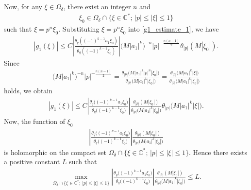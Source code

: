 \documentclass[11pt]{article}
\numberwithin{equation}{section}
\begin{document}
Now, for any $\xi \in\Omega_\delta$, there exist an integer $n$ and
\begin{gather*}
\xi_0\in\Omega_\delta \cap\{\xi\in\mathbb{C}^* ;\,|p|\le|\xi|\le1\}
\end{gather*}
such that $\xi=p^n\xi_0$.
Substituting $\xi=p^n\xi_0$ into \eqref{g1_estimate_1}, we have
\begin{gather*}
|g_1(\xi)|\le C\left|\frac{\theta_q((-1)^{k-1}a_1\xi_0)}{\theta_q((-1)^{k-1}\xi_0)}\right|\big(M|a_1|^k\big)^{-n}|p|^{-\frac{n(n-1)}{2}}\theta_{|p|}(M|\xi_0|).
\end{gather*}
Since
\begin{gather*}
\big(M|a_1|^k\big)^{-n}|p|^{-\frac{n(n-1)}{2}}=\frac{\theta_{|p|}\big(M|a_1|^k|p|^n|\xi_0|\big)}{\theta_{|p|}\big(M|a_1|^k|\xi_0|\big)}=\frac{\theta_{|p|}\big(M|a_1|^k|\xi|\big)}{\theta_{|p|}\big(M|a_1|^k|\xi_0|\big)}
\end{gather*}
holds, we obtain
\begin{gather*}
|g_1(\xi)|\le C\left|\frac{\theta_q\big((-1)^{k-1}a_1\xi_0\big)}{\theta_q\big((-1)^{k-1}\xi_0\big)}\right|\frac{\theta_{|p|}(M|\xi_0|)}{\theta_{|p|}\big(M|a_1|^k|\xi_0|\big)}\theta_{|p|}\big(M|a_1|^k|\xi|\big).
\end{gather*}
Now, the function of $\xi_0$
\begin{gather*}
\left|\frac{\theta_q\big((-1)^{k-1}a_1\xi_0\big)}{\theta_q\big((-1)^{k-1}\xi_0\big)}\right|\frac{\theta_{|p|}(M|\xi_0|)}{\theta_{|p|}\big(M|a_1|^k|\xi_0|\big)}
\end{gather*}
is holomorphic on the compact set $\Omega_\delta \cap\{\xi\in\mathbb{C}^* ;\,|p|\le|\xi|\le1\}$. Hence there exists a positive constant $L$ such that
\begin{gather*}
\max_{\Omega_\delta \cap\{\xi\in\mathbb{C}^* ;\,|p|\le|\xi|\le1\}}\left|\frac{\theta_q\big((-1)^{k-1}a_1\xi_0\big)}{\theta_q\big((-1)^{k-1}\xi_0\big)}\right|\frac{\theta_{|p|}(M|\xi_0|)}{\theta_{|p|}\big(M|a_1|^k|\xi_0|\big)}\le L.
\end{gather*}
\end{document}
